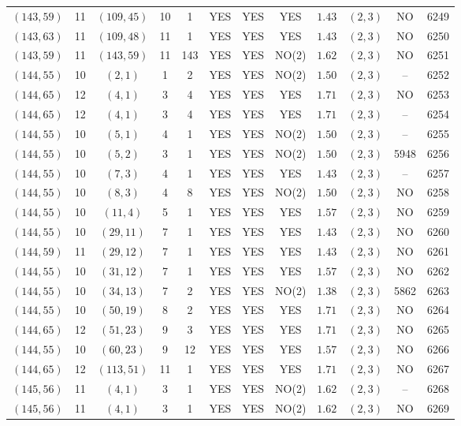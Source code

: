 \begin{longtable}{|c|c|c|c|c|c|c|c|c|c|c|c|}
$(143,59)$ & 11 & $(109,45)$ & 10 & 1 & YES & YES & YES & $1.43$ & $(2,3)$ & NO & 6249\\
$(143,63)$ & 11 & $(109,48)$ & 11 & 1 & YES & YES & YES & $1.43$ & $(2,3)$ & NO & 6250\\
$(143,59)$ & 11 & $(143,59)$ & 11 & 143 & YES & YES & NO(2) & $1.62$ & $(2,3)$ & NO & 6251\\
$(144,55)$ & 10 & $(2,1)$ & 1 & 2 & YES & YES & NO(2) & $1.50$ & $(2,3)$ & -- & 6252\\
$(144,65)$ & 12 & $(4,1)$ & 3 & 4 & YES & YES & YES & $1.71$ & $(2,3)$ & NO & 6253\\
$(144,65)$ & 12 & $(4,1)$ & 3 & 4 & YES & YES & YES & $1.71$ & $(2,3)$ & -- & 6254\\
$(144,55)$ & 10 & $(5,1)$ & 4 & 1 & YES & YES & NO(2) & $1.50$ & $(2,3)$ & -- & 6255\\
$(144,55)$ & 10 & $(5,2)$ & 3 & 1 & YES & YES & NO(2) & $1.50$ & $(2,3)$ & 5948 & 6256\\
$(144,55)$ & 10 & $(7,3)$ & 4 & 1 & YES & YES & YES & $1.43$ & $(2,3)$ & -- & 6257\\
$(144,55)$ & 10 & $(8,3)$ & 4 & 8 & YES & YES & NO(2) & $1.50$ & $(2,3)$ & NO & 6258\\
$(144,55)$ & 10 & $(11,4)$ & 5 & 1 & YES & YES & YES & $1.57$ & $(2,3)$ & NO & 6259\\
$(144,55)$ & 10 & $(29,11)$ & 7 & 1 & YES & YES & YES & $1.43$ & $(2,3)$ & NO & 6260\\
$(144,59)$ & 11 & $(29,12)$ & 7 & 1 & YES & YES & YES & $1.43$ & $(2,3)$ & NO & 6261\\
$(144,55)$ & 10 & $(31,12)$ & 7 & 1 & YES & YES & YES & $1.57$ & $(2,3)$ & NO & 6262\\
$(144,55)$ & 10 & $(34,13)$ & 7 & 2 & YES & YES & NO(2) & $1.38$ & $(2,3)$ & 5862 & 6263\\
$(144,55)$ & 10 & $(50,19)$ & 8 & 2 & YES & YES & YES & $1.71$ & $(2,3)$ & NO & 6264\\
$(144,65)$ & 12 & $(51,23)$ & 9 & 3 & YES & YES & YES & $1.71$ & $(2,3)$ & NO & 6265\\
$(144,55)$ & 10 & $(60,23)$ & 9 & 12 & YES & YES & YES & $1.57$ & $(2,3)$ & NO & 6266\\
$(144,65)$ & 12 & $(113,51)$ & 11 & 1 & YES & YES & YES & $1.71$ & $(2,3)$ & NO & 6267\\
$(145,56)$ & 11 & $(4,1)$ & 3 & 1 & YES & YES & NO(2) & $1.62$ & $(2,3)$ & -- & 6268\\
$(145,56)$ & 11 & $(4,1)$ & 3 & 1 & YES & YES & NO(2) & $1.62$ & $(2,3)$ & NO & 6269\\

\end{longtable}
